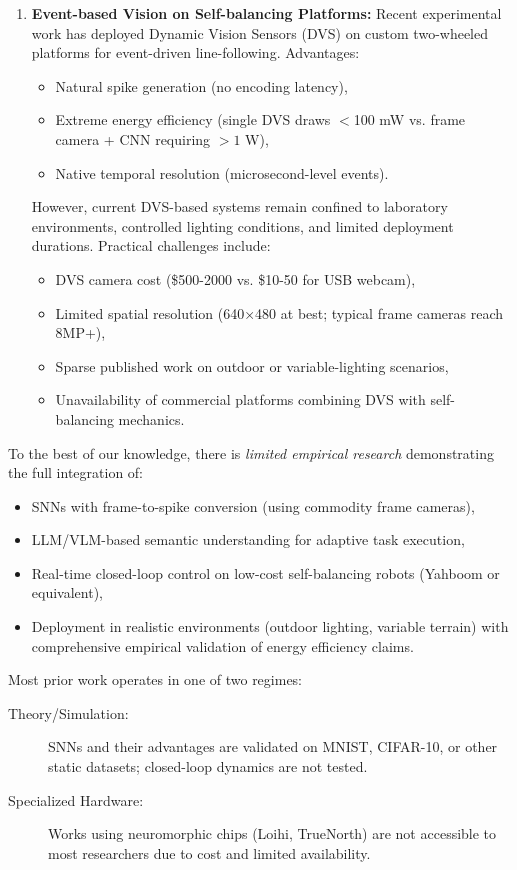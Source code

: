 \begin{enumerate}
    
\item \textbf{Event-based Vision on Self-balancing Platforms:}
Recent experimental work \cite{jin2022neuromorphic} has deployed Dynamic Vision Sensors (DVS) on custom two-wheeled 
platforms for event-driven line-following. Advantages:
    \begin{itemize}
        \item Natural spike generation (no encoding latency),
        \item Extreme energy efficiency (single DVS draws $<$100 mW vs. frame camera + CNN requiring $>1$ W),
        \item Native temporal resolution (microsecond-level events).
    \end{itemize}

However, current DVS-based systems remain confined to laboratory environments, controlled lighting conditions, and 
limited deployment durations. Practical challenges include:
    \begin{itemize}
        \item DVS camera cost (\$500-2000 vs. \$10-50 for USB webcam),
        \item Limited spatial resolution (640×480 at best; typical frame cameras reach 8MP+),
        \item Sparse published work on outdoor or variable-lighting scenarios,
        \item Unavailability of commercial platforms combining DVS with self-balancing mechanics.
    \end{itemize}

\end{enumerate}

To the best of our knowledge, there is \emph{limited empirical research} demonstrating the full integration of:
\begin{itemize}
    \item SNNs with frame-to-spike conversion (using commodity frame cameras),
    \item LLM/VLM-based semantic understanding for adaptive task execution,
    \item Real-time closed-loop control on low-cost self-balancing robots (Yahboom or equivalent),
    \item Deployment in realistic environments (outdoor lighting, variable terrain) with comprehensive 
    empirical validation of energy efficiency claims.
\end{itemize}

Most prior work operates in one of two regimes:
\begin{description}
    \item[Theory/Simulation:] SNNs and their advantages are validated on MNIST, CIFAR-10, or other static datasets; 
    closed-loop dynamics are not tested.
    
    \item[Specialized Hardware:] Works using neuromorphic chips (Loihi, TrueNorth) are not accessible to most 
    researchers due to cost and limited availability.
\end{description}

